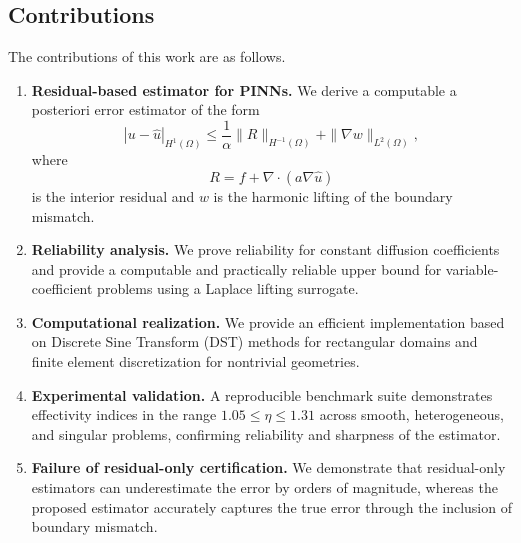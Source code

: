 \subsection{Contributions}

The contributions of this work are as follows.

\begin{enumerate}[leftmargin=*]

\item \textbf{Residual-based estimator for PINNs.}
We derive a computable a posteriori error estimator of the form
\[
|u - \hat{u}|_{H^1(\Omega)}
\leq
\frac{1}{\alpha}\|R\|_{H^{-1}(\Omega)} + \|\nabla w\|_{L^2(\Omega)},
\]
where
\[
R = f + \nabla \cdot (a \nabla \hat{u})
\]
is the interior residual and $w$ is the harmonic lifting of the boundary mismatch.

\item \textbf{Reliability analysis.}
We prove reliability for constant diffusion coefficients and provide a
computable and practically reliable upper bound for variable-coefficient
problems using a Laplace lifting surrogate.

\item \textbf{Computational realization.}
We provide an efficient implementation based on Discrete Sine Transform (DST)
methods for rectangular domains and finite element discretization for
nontrivial geometries.

\item \textbf{Experimental validation.}
A reproducible benchmark suite demonstrates effectivity indices in the range
$1.05 \le \eta \le 1.31$ across smooth, heterogeneous, and singular problems,
confirming reliability and sharpness of the estimator.

\item \textbf{Failure of residual-only certification.}
We demonstrate that residual-only estimators can underestimate the error by
orders of magnitude, whereas the proposed estimator accurately captures the
true error through the inclusion of boundary mismatch.

\end{enumerate}